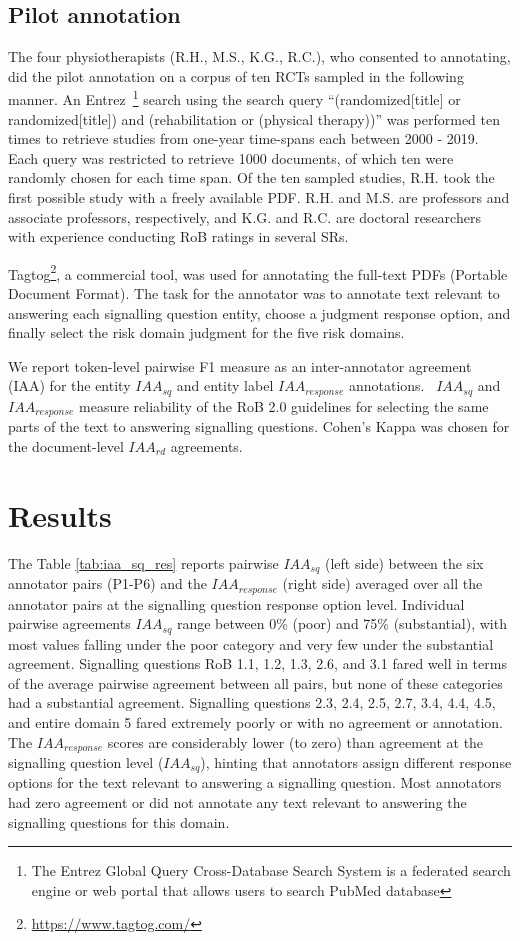 \documentclass{IOS-Book-Article}
\begin{document}
\subsection{Pilot annotation}
\label{subsec:annotation}
%
The four physiotherapists (R.H., M.S., K.G., R.C.), who consented to annotating, did the pilot annotation on a corpus of ten RCTs sampled in the following manner.
An Entrez~\footnote{The Entrez Global Query Cross-Database Search System is a federated search engine or web portal that allows users to search PubMed database} search using the search query ``{\selectfont (randomized[title] or randomized[title]) and (rehabilitation or (physical therapy))}'' was performed ten times to retrieve studies from one-year time-spans each between 2000 - 2019.
Each query was restricted to retrieve 1000 documents, of which ten were randomly chosen for each time span.
Of the ten sampled studies, R.H. took the first possible study with a freely available PDF.
R.H. and M.S. are professors and associate professors, respectively, and K.G. and R.C. are doctoral researchers with experience conducting RoB ratings in several SRs.


Tagtog\footnote{\url{https://www.tagtog.com/}}, a commercial tool, was used for annotating the full-text PDFs (Portable Document Format).
The task for the annotator was to annotate text relevant to answering each signalling question entity, choose a judgment response option, and finally select the risk domain judgment for the five risk domains.

We report token-level pairwise F1 measure as an inter-annotator agreement (IAA) for the entity $IAA_{sq}$ and entity label $IAA_{response}$
annotations.~\cite{brandsen2020creating,deleger2012building}
$IAA_{sq}$ and $IAA_{response}$ measure reliability of the RoB 2.0 guidelines for selecting the same parts of the text to answering signalling questions.
Cohen's Kappa was chosen for the document-level $IAA_{rd}$ agreements.~\cite{mchugh2012interrater}
%
%
%
\section{Results}
\label{sec:results}
%
The Table \ref{tab:iaa_sq_res} reports pairwise $IAA_{sq}$ (left side) between the six annotator pairs (P1-P6) and the $IAA_{response}$ (right side) averaged over all the annotator pairs at the signalling question response option level.
Individual pairwise agreements $IAA_{sq}$ range between 0\% (poor) and 75\% (substantial), with most values falling under the poor category and very few under the substantial agreement.
Signalling questions RoB 1.1, 1.2, 1.3, 2.6, and 3.1 fared well in terms of the average pairwise agreement between all pairs, but none of these categories had a substantial agreement.
Signalling questions 2.3, 2.4, 2.5, 2.7, 3.4, 4.4, 4.5, and entire domain 5 fared extremely poorly or with no agreement or annotation.
The $IAA_{response}$ scores are considerably lower (to zero) than agreement at the signalling question level ($IAA_{sq}$), hinting that annotators assign different response options for the text relevant to answering a signalling question. 
Most annotators had zero agreement or did not annotate any text relevant to answering the signalling questions for this domain.
\end{document}
